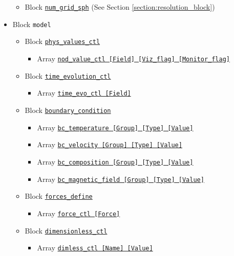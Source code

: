 \begin{itemize}
\begin{itemize}
	\item Block \hyperref[href_i:num_grid_sph]
		{\tt num\_grid\_sph} (See Section \ref{section:resolution_block})
	\end{itemize}
%
\item Block \verb|model|
	\begin{itemize}
	\item Block \hyperref[href_t:phys_values_ctl]{\tt phys\_values\_ctl}
		\begin{itemize} \label{href_i:phys_values_ctl}
		\item Array \hyperref[href_t:nod_value_ctl]
			{\tt nod\_value\_ctl    [Field]  [Viz\_flag]  [Monitor\_flag]}
		\end{itemize}
%
	\item Block \hyperref[href_t:time_evolution_ctl]{\tt time\_evolution\_ctl}
		\begin{itemize} \label{href_i:time_evolution_ctl}
		\item Array \hyperref[href_t:time_evo_ctl]
			{\tt time\_evo\_ctl    [Field]}
		\end{itemize}
%
	\item Block \hyperref[href_t:boundary_condition]{\tt boundary\_condition}
		\begin{itemize} \label{href_i:boundary_condition}
		\item Array \hyperref[href_t:bc_temperature]
            {\tt bc\_temperature       [Group]  [Type]  [Value]}
		\item Array \hyperref[href_t:bc_velocity]
			{\tt bc\_velocity          [Group]  [Type]  [Value]}
		\item Array \hyperref[href_t:bc_composition]
			{\tt bc\_composition       [Group]  [Type]  [Value]}
		\item Array \hyperref[href_t:bc_magnetic_field]
			{\tt bc\_magnetic\_field    [Group]  [Type]  [Value]}
		\end{itemize}
%
	\item Block \hyperref[href_t:forces_define]{\tt forces\_define}
		\begin{itemize} \label{href_i:forces_define}
		\item Array \hyperref[href_t:force_ctl]{\tt force\_ctl    [Force]}
		\end{itemize}
%
	\item Block \hyperref[href_t:dimensionless_ctl]{\tt dimensionless\_ctl}
		\begin{itemize} \label{href_i:dimensionless_ctl}
		\item Array \hyperref[href_t:dimless_ctl]{\tt dimless\_ctl    [Name]  [Value]}

\end{itemize}
\end{itemize}
\end{itemize}
